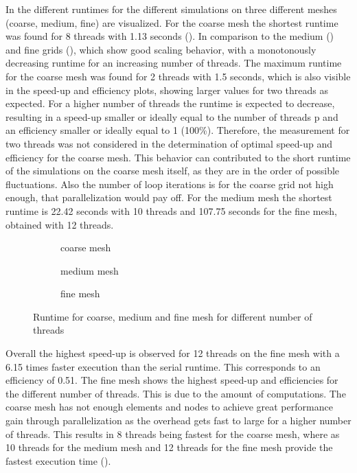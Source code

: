 In  the different runtimes for the different simulations on three different meshes (coarse, medium, fine) are visualized.
For the coarse mesh the shortest runtime was found for 8 threads with 1.13 seconds (). In comparison to the medium () and fine grids (), which show good scaling behavior, with a monotonously decreasing runtime for an increasing number of threads. The maximum runtime for the coarse mesh was found for 2 threads with 1.5 seconds, which is also visible in the speed-up and efficiency plots, showing larger values for two threads as expected. For a higher number of threads the runtime is expected to decrease, resulting in a speed-up smaller or ideally equal to the number of threads p and an efficiency smaller or ideally equal to 1 (100\%).
Therefore, the measurement for two threads was not considered in the determination of optimal speed-up and efficiency for the coarse mesh. This behavior can contributed to the short runtime of the simulations on the coarse mesh itself, as they are in the order of possible fluctuations. Also the number of loop iterations is for the coarse grid not high enough, that parallelization would pay off. For the medium mesh the shortest runtime is 22.42 seconds with 10 threads and 107.75 seconds for the fine mesh, obtained with 12 threads.
%
\begin{figure}[h!]
	\centering
	\begin{subfigure}{0.7\textwidth}
		\centering
		\resizebox{0.54\width}{!}{}
		\caption{\label{fig::Rcoarse} coarse mesh}
	\end{subfigure}
	\hfill
	\begin{subfigure}{0.7\textwidth}
		\centering
		\resizebox{0.54\width}{!}{}
		\caption{\label{fig::Rmedium} medium mesh}
	\end{subfigure}
	\hfill
	\begin{subfigure}{0.7\textwidth}
		\centering
		\resizebox{0.54\width}{!}{}
		\caption{\label{fig::Rfine} fine mesh}
	\end{subfigure}
	\caption{\label{fig::Runtime} Runtime for coarse, medium and fine mesh for different number of threads}
\end{figure}

\clearpage \noindent
Overall the highest speed-up is observed for 12 threads on the fine mesh with a 6.15 times faster execution than the serial runtime. This corresponds to an efficiency of 0.51. The fine mesh shows the highest speed-up and efficiencies for the different number of threads. This is due to the amount of computations. The coarse mesh has not enough elements and nodes to achieve great performance gain through parallelization as the overhead gets fast to large for a higher number of threads. This results in 8 threads being fastest for the coarse mesh, where as 10 threads for the medium mesh and 12 threads for the fine mesh provide the fastest execution time ().

